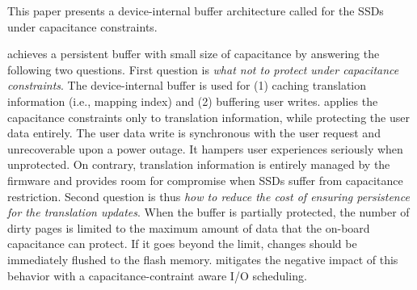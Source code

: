 This paper presents a device-internal buffer architecture called \ours{} 
for the SSDs under capacitance constraints. 

\ours{} achieves a persistent buffer with small size of capacitance by answering the following two questions. 
First question is \textit{what not to protect under capacitance constraints}. The device-internal buffer is used for (1) caching translation information (i.e., mapping index) and (2) buffering user writes. 
\ours{} applies the capacitance constraints only to translation information, while protecting the user data entirely. The user data write is synchronous with the user request and unrecoverable upon a power outage. It hampers user experiences seriously when unprotected. On contrary, 
translation information is entirely managed by the firmware and provides room for compromise when SSDs suffer from capacitance restriction.  
Second question is thus \textit{how to reduce the cost of ensuring persistence for the translation updates}. When the buffer is partially protected, the number of dirty pages is limited to the maximum amount of data that the on-board capacitance can protect. If it goes beyond the limit, changes should be immediately flushed to the flash memory. \ours{} mitigates the negative impact of this behavior with a capacitance-contraint aware I/O scheduling.


